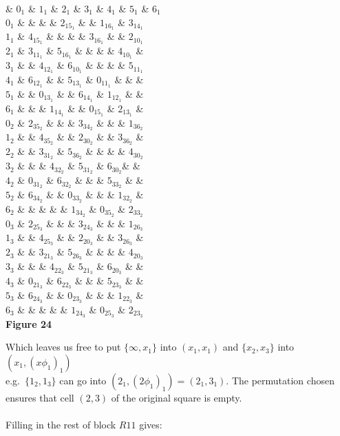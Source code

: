 \documentclass[
  12pt,
  a4paper]{book}
\begin{document}
\& \(0_1\) \& \(1_1\) \& \(2_1\) \& \(3_1\) \& \(4_1\) \& \(5_1\) \&
\(6_1\)\\
\(0_1\) \& \& \& \& \(2_15_1\) \& \& \(1_16_1\) \& \(3_14_1\)\\
\(1_1\) \& \(4_15_1\) \& \& \& \& \(3_16_1\) \& \& \(2_10_1\)\\
\(2_1\) \& \(3_11_1\) \& \(5_16_1\) \& \& \& \& \(4_10_1\) \&\\
\(3_1\) \& \& \(4_12_1\) \& \(6_10_1\) \& \& \& \& \(5_11_1\)\\
\(4_1\) \& \(6_12_1\) \& \& \(5_13_1\) \& \(0_11_1\) \& \& \&\\
\(5_1\) \& \& \(0_13_1\) \& \& \(6_14_1\) \& \(1_12_1\) \& \&\\
\(6_1\) \& \& \& \(1_14_1\) \& \& \(0_15_1\) \& \(2_13_1\) \&\\
\(0_2\) \& \(2_35_2\) \& \& \& \(3_34_2\) \& \& \& \(1_36_2\)\\
\(1_2\) \& \& \(4_35_2\) \& \& \(2_30_2\) \& \& \(3_36_2\) \&\\
\(2_2\) \& \& \(3_31_2\) \& \(5_36_2\) \& \& \& \& \(4_30_2\)\\
\(3_2\) \& \& \& \(4_32_2\) \& \(5_31_2\) \& \(6_30_2\)\& \&\\
\(4_2\) \& \(0_31_2\) \& \(6_32_2\) \& \& \& \(5_33_2\) \& \&\\
\(5_2\) \& \(6_34_2\) \& \& \(0_33_2\) \& \& \& \(1_32_2\) \&\\
\(6_2\) \& \& \& \& \& \(1_34_2\) \& \(0_35_2\) \& \(2_33_2\)\\
\(0_3\) \& \(2_25_3\) \& \& \& \(3_24_3\) \& \& \& \(1_26_3\)\\
\(1_3\) \& \& \(4_25_3\) \& \& \(2_20_3\) \& \& \(3_26_3\) \&\\
\(2_3\) \& \& \(3_21_3\) \& \(5_26_3\) \& \& \& \& \(4_20_3\)\\
\(3_3\) \& \& \& \(4_22_3\) \& \(5_21_3\) \& \(6_20_3\) \& \&\\
\(4_3\) \& \(0_21_3\) \& \(6_22_3\) \& \& \& \(5_23_3\) \& \&\\
\(5_3\) \& \(6_24_3\) \& \& \(0_23_3\) \& \& \& \(1_22_3\) \&\\
\(6_3\) \& \& \& \& \& \(1_24_3\) \& \(0_25_3\) \& \(2_23_3\)\\

\textbf{Figure 24}

Which leaves us free to put \(\{\infty, x_1\}\) into \((x_1,x_1)\) and
\(\{x_2,x_3\}\) into \((x_1,(x\phi _1)_1)\)\\
e.g.~\(\{1_2,1_3\}\) can go into \((2_1,(2\phi _1)_1)=(2_1,3_1)\). The
permutation chosen ensures that cell \((2,3)\) of the original square is
empty.\\
~\\
Filling in the rest of block \(R11\) gives:
\end{document}
